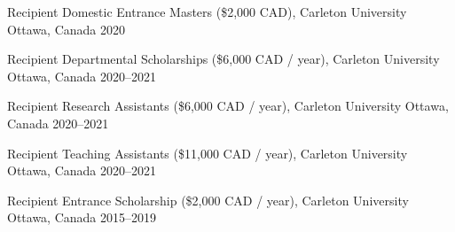 \begin{cvhonors}

  \cvhonor
    {Recipient} %
    {Domestic Entrance Masters (\$2,000 CAD), Carleton University} %
    {Ottawa, Canada} %
    {2020} %

  \cvhonor
    {Recipient} %
    {Departmental Scholarships (\$6,000 CAD / year), Carleton University} %
    {Ottawa, Canada} %
    {2020--2021} %

  \cvhonor
    {Recipient} %
    {Research Assistants (\$6,000 CAD / year), Carleton University} %
    {Ottawa, Canada} %
    {2020--2021} %

  \cvhonor
    {Recipient} %
    {Teaching Assistants (\$11,000 CAD / year), Carleton University} %
    {Ottawa, Canada} %
    {2020--2021} %

  \cvhonor
    {Recipient} %
    {Entrance Scholarship (\$2,000 CAD / year), Carleton University} %
    {Ottawa, Canada} %
    {2015--2019} %

\end{cvhonors}

